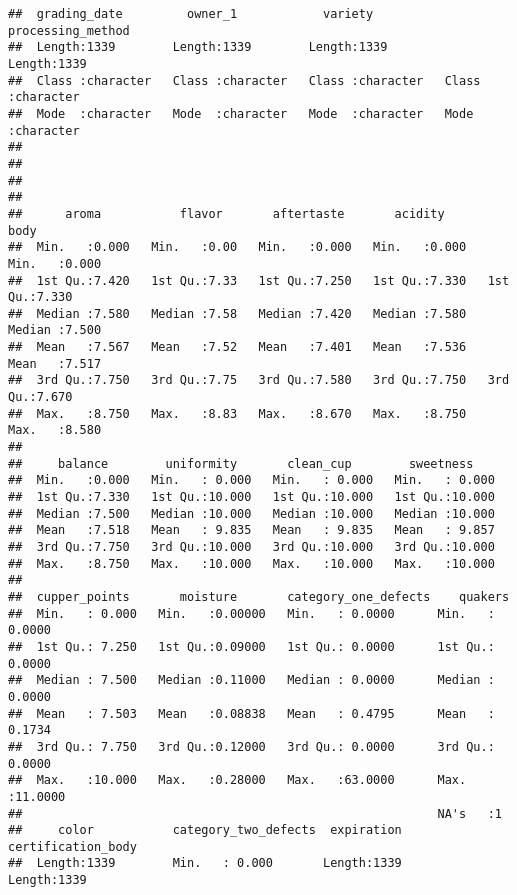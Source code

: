 \documentclass[
]{article}
\begin{document}
\begin{verbatim}
##  grading_date         owner_1            variety          processing_method 
##  Length:1339        Length:1339        Length:1339        Length:1339       
##  Class :character   Class :character   Class :character   Class :character  
##  Mode  :character   Mode  :character   Mode  :character   Mode  :character  
##                                                                             
##                                                                             
##                                                                             
##                                                                             
##      aroma           flavor       aftertaste       acidity           body      
##  Min.   :0.000   Min.   :0.00   Min.   :0.000   Min.   :0.000   Min.   :0.000  
##  1st Qu.:7.420   1st Qu.:7.33   1st Qu.:7.250   1st Qu.:7.330   1st Qu.:7.330  
##  Median :7.580   Median :7.58   Median :7.420   Median :7.580   Median :7.500  
##  Mean   :7.567   Mean   :7.52   Mean   :7.401   Mean   :7.536   Mean   :7.517  
##  3rd Qu.:7.750   3rd Qu.:7.75   3rd Qu.:7.580   3rd Qu.:7.750   3rd Qu.:7.670  
##  Max.   :8.750   Max.   :8.83   Max.   :8.670   Max.   :8.750   Max.   :8.580  
##                                                                                
##     balance        uniformity       clean_cup        sweetness     
##  Min.   :0.000   Min.   : 0.000   Min.   : 0.000   Min.   : 0.000  
##  1st Qu.:7.330   1st Qu.:10.000   1st Qu.:10.000   1st Qu.:10.000  
##  Median :7.500   Median :10.000   Median :10.000   Median :10.000  
##  Mean   :7.518   Mean   : 9.835   Mean   : 9.835   Mean   : 9.857  
##  3rd Qu.:7.750   3rd Qu.:10.000   3rd Qu.:10.000   3rd Qu.:10.000  
##  Max.   :8.750   Max.   :10.000   Max.   :10.000   Max.   :10.000  
##                                                                    
##  cupper_points       moisture       category_one_defects    quakers       
##  Min.   : 0.000   Min.   :0.00000   Min.   : 0.0000      Min.   : 0.0000  
##  1st Qu.: 7.250   1st Qu.:0.09000   1st Qu.: 0.0000      1st Qu.: 0.0000  
##  Median : 7.500   Median :0.11000   Median : 0.0000      Median : 0.0000  
##  Mean   : 7.503   Mean   :0.08838   Mean   : 0.4795      Mean   : 0.1734  
##  3rd Qu.: 7.750   3rd Qu.:0.12000   3rd Qu.: 0.0000      3rd Qu.: 0.0000  
##  Max.   :10.000   Max.   :0.28000   Max.   :63.0000      Max.   :11.0000  
##                                                          NA's   :1        
##     color           category_two_defects  expiration        certification_body
##  Length:1339        Min.   : 0.000       Length:1339        Length:1339       

\end{verbatim}
\end{document}
